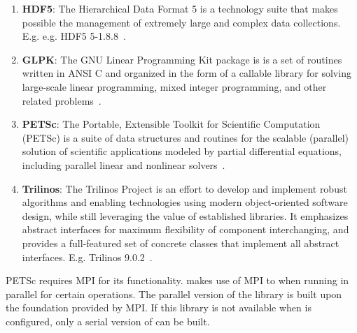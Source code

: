 \begin{enumerate}%
\item \textbf{HDF5}: The Hierarchical Data Format 5 is a technology suite that makes possible the management of extremely large and complex data collections. E.g. e.g. HDF5  5-1.8.8~\cite{HDF5}.

\item \textbf{GLPK}: The GNU Linear Programming Kit package is is a set of routines written in ANSI C and organized in the form of a callable library for solving large-scale linear programming, mixed integer programming, and other related problems~\cite{GLPK}. 

\item \textbf{PETSc}: The Portable, Extensible Toolkit for Scientific Computation (PETSc) is a suite of data structures and routines for the scalable (parallel) solution of scientific applications modeled by partial differential equations, including parallel linear and nonlinear solvers~\cite{Petsc}.

\item \textbf{Trilinos}: The Trilinos Project is an effort to develop and implement robust algorithms and enabling technologies using modern object-oriented software design, while still leveraging the value of established libraries. It emphasizes abstract interfaces for maximum flexibility of component interchanging, and provides a full-featured set of concrete classes that implement all abstract interfaces.  E.g. Trilinos 9.0.2~\cite{Trilinos}.
\end{enumerate}%

PETSc requires MPI for its functionality. \Queso{} makes use of MPI to when running in parallel for certain operations.
 {\color{blue}The parallel version of the library is built upon the foundation provided by MPI. If this library is not available when \Queso{} is configured, only a serial version of \Queso{} can be built.}




